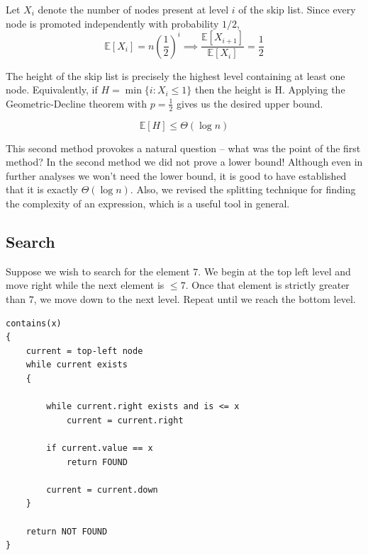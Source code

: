 \noindent Let \(X_i\) denote the number of nodes present at level \(i\) of the skip list. Since 
every node is promoted independently with probability \(1/2\),
\[
\mathbb E[X_i]
=
n\left(\frac12\right)^i
\implies
\frac{\mathbb E[X_{i+1}]}{\mathbb E[X_i]}
=
\frac12
\]

The height of the skip list is precisely the highest level 
containing at least one node. Equivalently, if $H=\min\{i:X_i \le 1\}$ then the height is H. Applying 
the Geometric-Decline theorem with \(p=\frac12\) gives us the desired upper bound.

\[
\mathbb E[H] \le \Theta(\log n)
\]


This second method provokes a natural question -- what was the point of the first method? In the second 
method we did not prove a lower bound! Although even in further analyses we won't need the lower bound, 
it is good to have established that it is exactly $\Theta(\log n)$. Also, we revised the 
splitting technique for finding the complexity of an expression, which is a useful tool in general.
\subsection{Search}

Suppose we wish to search for the element \(7\). We begin at the top left level and move right while 
the next element is \(\leq 7\). Once that element is strictly greater than \(7\), we move down to 
the next level. Repeat until we reach the bottom level.\\

\begin{center}
\begin{minipage}{0.9\linewidth}
\begin{framed}
\begin{Verbatim}
contains(x)
{
    current = top-left node
    while current exists
    {

        while current.right exists and is <= x
            current = current.right

        if current.value == x
            return FOUND

        current = current.down
    }
    
    return NOT FOUND
}
\end{Verbatim}
\vspace{-4mm}
\end{framed}
\end{minipage}
\end{center}

